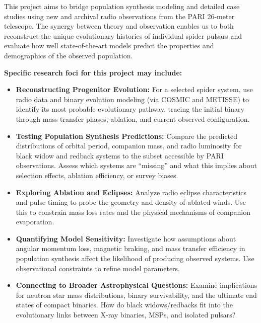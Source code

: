 \documentclass[12pt]{article}
\begin{document}
\vspace{1em}

This project aims to bridge population synthesis modeling and detailed case studies using new and archival radio observations from the PARI 26-meter telescope. The synergy between theory and observation enables us to both reconstruct the unique evolutionary histories of individual spider pulsars and evaluate how well state-of-the-art models predict the properties and demographics of the observed population.

\vspace{1em}

\textbf{Specific research foci for this project may include:}
\begin{itemize}
    \item \textbf{Reconstructing Progenitor Evolution:} For a selected spider system, use radio data and binary evolution modeling (via COSMIC and METISSE) to identify its most probable evolutionary pathway, tracing the initial binary through mass transfer phases, ablation, and current observed configuration.
    \item \textbf{Testing Population Synthesis Predictions:} Compare the predicted distributions of orbital period, companion mass, and radio luminosity for black widow and redback systems to the subset accessible by PARI observations. Assess which systems are “missing” and what this implies about selection effects, ablation efficiency, or survey biases.
    \item \textbf{Exploring Ablation and Eclipses:} Analyze radio eclipse characteristics and pulse timing to probe the geometry and density of ablated winds. Use this to constrain mass loss rates and the physical mechanisms of companion evaporation.
    \item \textbf{Quantifying Model Sensitivity:} Investigate how assumptions about angular momentum loss, magnetic braking, and mass transfer efficiency in population synthesis affect the likelihood of producing observed systems. Use observational constraints to refine model parameters.
    \item \textbf{Connecting to Broader Astrophysical Questions:} Examine implications for neutron star mass distributions, binary survivability, and the ultimate end states of compact binaries. How do black widows/redbacks fit into the evolutionary links between X-ray binaries, MSPs, and isolated pulsars?
\end{itemize}

\vspace{1em}
\end{document}
